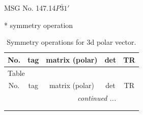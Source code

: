 \documentclass[fleqn,8pt]{jsarticle}
\begin{document}
\setcounter{MaxMatrixCols}{32}

\renewcommand{\tablename}{Table~}
\renewcommand{\figurename}{Figure~}
\begin{center}
\LARGE
MSG No. 147.14\quad$P\bar{3}1'$
\end{center}
* symmetry operation
\renewcommand{\arraystretch}{1.3}
\begin{longtable}{ccccc}
\caption{Symmetry operations for 3d polar vector.}
 \\
 \hline \hline
No. & tag & matrix (polar) & det & TR \\ \hline \endfirsthead

\multicolumn{4}{l}{\tablename\ \thetable{}} \\
 \hline \hline
No. & tag & matrix (polar) & det & TR \\ \hline \endhead

 \hline \hline
\multicolumn{4}{r}{\footnotesize\it continued ...} \\ \endfoot

 \hline \hline
\multicolumn{4}{r}{} \\ \endlastfoot


\end{longtable}
\end{document}

